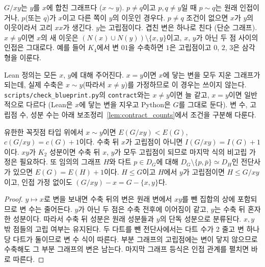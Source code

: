 \begin{definition}[변 수축]
\label{def:contract}
\leanok
\(G/xy\)는 \(y\)를 \(x\)에 합친 그래프다 (\(x \sim y\)). \(p \ne q\)이고 \(p, q \ne y\)일 때 \(p \sim q\)는
원래 인접이거나, \(p\)(또는 \(q\))가 \(x\)이고 다른 쪽이 \(y\)의 이웃인 경우다. \(p \ne q\) 조건이 없으면
\(x\)가 \(y\)의 이웃이라서 고리 \(xx\)가 생긴다. \(y\)는 고립점이다. 겹친 변은 하나로 친다 (단순 그래프).
\(x \ne y\)이면 \(x\)의 새 이웃은 \((N(x) \cup N(y)) \setminus \{x, y\}\)이고, \(x\), \(y\)가 아닌 두 점
사이의 인접은 그대로다. 예를 들어 \(K_4\)에서 변 \(01\)을 수축하면 \(1\)은 고립점이고 \(0\), \(2\), \(3\)은
삼각형을 이룬다.

Lean 정의는 모든 \(x\), \(y\)에 대해 주어진다. \(x = y\)이면 \(x\)에 닿는 변을 모두 지운 그래프가 되는데,
실제 수축은 \(x \sim y\)(따라서 \(x \ne y\))를 가정하므로 이 경우는 쓰이지 않는다.
\texttt{scripts/check\_blueprint.py}의 \texttt{contract}와는 \(x \ne y\)이면 늘 같고, \(x = y\)이면 일반적으로
다르다 (Lean은 \(x\)에 닿는 변을 지우고 Python은 \(G\)를 그대로 둔다). 변 수, 고립점 수, 성분 수는
아래 보조정리~\ref{lem:contract_counts}에서 조건을 구분해 다룬다.
\end{definition}

\begin{lemma}[수축의 변과 성분 수]
\label{lem:contract_counts}
\leanok
유한한 꼭짓점 타입 위에서 \(x \sim y\)이면 \(E(G/xy) < E(G)\), \(c(G/xy) = c(G)+1\)이다.
수축 뒤 \(x\)가 고립점이 아니면 \(I(G/xy) = I(G)+1\)이다. \(xy\)가 \(K_2\) 성분이면 수축 뒤
\(x\), \(y\)가 모두 고립점이 되므로 마지막 식의 비고립 가정은 필요하다.
또 임의의 그래프 \(H\)와 다트 \(p \in D_G\)에 대해
\(D_G \setminus \{p,\bar p\} \simeq D_H\)인 전단사가 있으면 \(E(G)=E(H)+1\)이다.
\(H \le G\)이고 \(H\)에서 \(y\)가 고립점이면 \(H \le G/xy\)이고, 인접 가정 없이도
\((G/xy)-x = G-\{x,y\}\)다.
\end{lemma}

\begin{proof}
\leanok
\(y \mapsto x\)로 변을 보내면 수축 뒤의 변은 원래 변에서 \(xy\)를 뺀 집합의 상에 포함되므로 변 수는 줄어든다.
\(y\)가 아닌 두 점은 수축 전후에 이어짐이 같고, \(y\)는 수축 뒤 혼자 한 성분이다. 따라서 수축 뒤 성분은
원래 성분들과 \(y\)의 단독 성분으로 분류된다. \(x,y\) 밖 점들의 고립 여부는 유지된다.
두 다트를 뺀 전단사에서는 다트 수가 2 줄고 변 하나당 다트가 둘이므로 변 수 식이 따른다.
부분 그래프의 고립점에는 변이 닿지 않으므로 수축해도 그 부분 그래프의 변은 남는다.
마지막 그래프 등식은 인접 관계를 펼치면 바로 따른다.
\end{proof}

